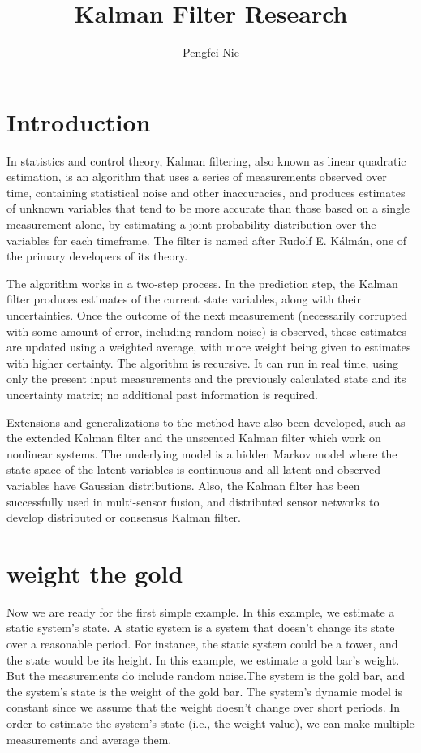 \documentclass[eng]{ajceam-class}
\title{Kalman Filter Research}
\author[1]{Pengfei Nie}
\affil[1]{V2X Software Engineer & pfnie@yahoo.com & https://github.com/pengfeinie}
\begin{document}
\maketitle
\thispagestyle{fancy}

\section{Introduction}
\quad In statistics and control theory, Kalman filtering, also known as linear quadratic estimation, is an algorithm that uses a series of measurements observed over time, containing statistical noise and other inaccuracies, and produces estimates of unknown variables that tend to be more accurate than those based on a single measurement alone, by estimating a joint probability distribution over the variables for each timeframe. The filter is named after Rudolf E. Kálmán, one of the primary developers of its theory.

The algorithm works in a two-step process. In the prediction step, the Kalman filter produces estimates of the current state variables, along with their uncertainties. Once the outcome of the next measurement (necessarily corrupted with some amount of error, including random noise) is observed, these estimates are updated using a weighted average, with more weight being given to estimates with higher certainty. The algorithm is recursive. It can run in real time, using only the present input measurements and the previously calculated state and its uncertainty matrix; no additional past information is required.

Extensions and generalizations to the method have also been developed, such as the extended Kalman filter and the unscented Kalman filter which work on nonlinear systems. The underlying model is a hidden Markov model where the state space of the latent variables is continuous and all latent and observed variables have Gaussian distributions. Also, the Kalman filter has been successfully used in multi-sensor fusion, and distributed sensor networks to develop distributed or consensus Kalman filter.
\section{weight the gold}
Now we are ready for the first simple example. In this example, we estimate a static system's state. A static system is a system that doesn't change its state over a reasonable period. For instance, the static system could be a tower, and the state would be its height.
In this example, we estimate a gold bar's weight. But the measurements do include random noise.The system is the gold bar, and the system's state is the weight of the gold bar. The system's dynamic model is constant since we assume that the weight doesn't change over short periods.
In order to estimate the system's state (i.e., the weight value), we can make multiple measurements and average them.
\end{document}
